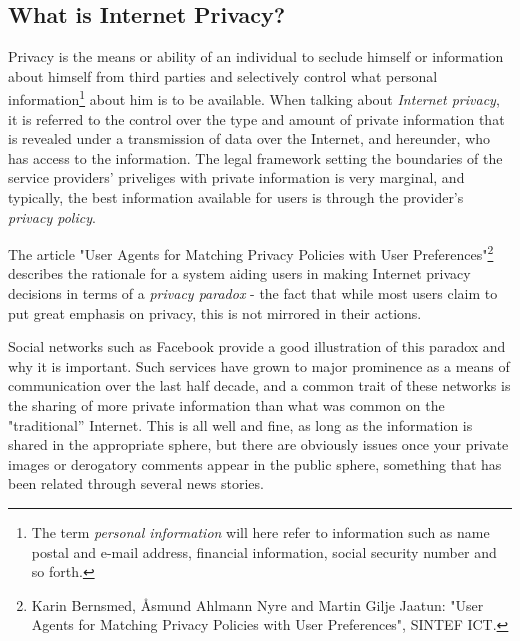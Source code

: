 \subsection{What is Internet Privacy?}
Privacy is the means or ability of an individual to seclude himself or information about himself from third parties and selectively control what personal information\footnote{The term \emph{personal information} will here refer to information such as name postal and e-mail address, financial information, social security number and so forth.} about him is to be available. When talking about \emph{Internet privacy}, it is referred to the control over the type and amount of private information that is revealed under a transmission of data over the Internet, and hereunder, who has access to the information. The legal framework setting the boundaries of the service providers' priveliges with private information is very marginal, and typically, the best information available for users is through the provider's \emph{privacy policy}.

The article "User Agents for Matching Privacy Policies with User Preferences"\footnote{Karin Bernsmed, {\AA}smund Ahlmann Nyre and Martin Gilje Jaatun: "User Agents for Matching Privacy Policies with User Preferences", SINTEF ICT.} describes the rationale for a system aiding users in making Internet privacy decisions in terms of a \emph{privacy paradox} - the fact that while most users claim to put great emphasis on privacy, this is not mirrored in their actions.

Social networks such as Facebook provide a good illustration of this paradox and why it is important. Such services have grown to major prominence as a means of communication over the last half decade, and a common trait of these networks is the sharing of more private information than what was common on the "traditional'' Internet. This is all well and fine, as long as the information is shared in the appropriate sphere, but there are obviously issues once your private images or derogatory comments appear in the public sphere, something that has been related through several news stories. 


